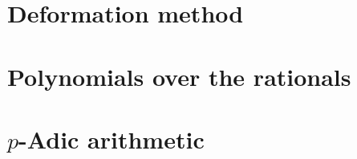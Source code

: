 
\chapter{Deformation method}


\chapter{Polynomials over the rationals}


\chapter{$p$-Adic arithmetic}

